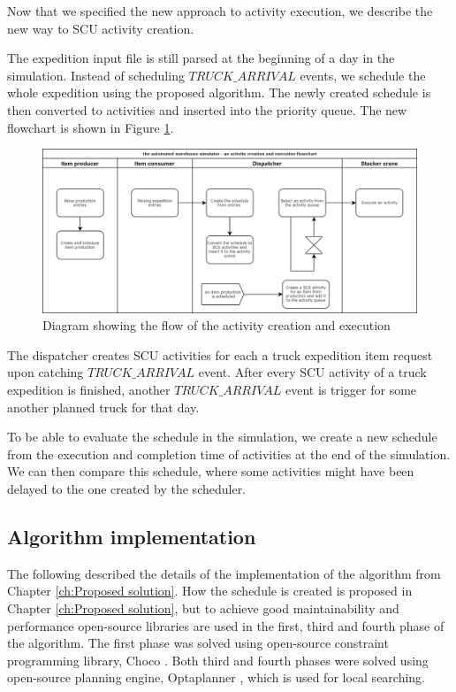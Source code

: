 \documentclass{ctuthesis}
\begin{document}
Now that we specified the new approach to activity execution, we describe the new way to SCU activity creation. 

The expedition input file is still parsed at the beginning of a day in the simulation. Instead of scheduling $TRUCK\_ARRIVAL$ events, we schedule the whole expedition using the proposed algorithm. The newly created schedule is then converted to activities and inserted into the priority queue. The new flowchart is shown in Figure \ref{flowchartNew}. 

\begin{figure}[H]
\includegraphics[width=1\linewidth]{flowchartNew.png}
\caption{Diagram showing the flow of the activity creation and execution}
\label{flowchartNew}
\end{figure}

The dispatcher creates SCU activities for each a truck expedition item request upon catching $TRUCK\_ARRIVAL$ event. After every SCU activity of a truck expedition is finished, another $TRUCK\_ARRIVAL$ event is trigger for some another planned truck for that day.  

To be able to evaluate the schedule in the simulation, we create a new schedule from the execution and completion time of activities at the end of the simulation. We can then compare this schedule, where some activities might have been delayed to the one created by the scheduler. 

\subsection{Algorithm implementation}

The following described the details of the implementation of the algorithm from Chapter \ref{ch:Proposed solution}. How the schedule is created is proposed in Chapter \ref{ch:Proposed solution}, but to achieve good maintainability and performance open-source libraries are used in the first, third and fourth phase of the algorithm. The first phase was solved using open-source constraint programming library, Choco \cite{choco}. Both third and fourth phases were solved using open-source planning engine, Optaplanner \cite{optaplanner}, which is used for local searching.
\end{document}
